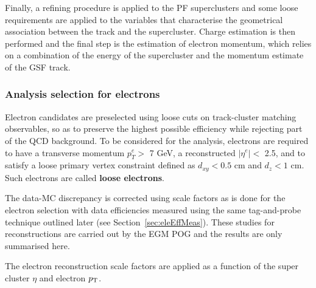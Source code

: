 Finally, a refining procedure is applied to the PF superclusters
and some loose requirements are applied to the variables that characterise the geometrical association between the track and the supercluster.
Charge estimation is then performed and the final step is the estimation of electron momentum,
which relies on a combination of the energy of the supercluster and the momentum estimate of the GSF track.

\subsubsection{Analysis selection for electrons}
\label{sec:ele_selection}
Electron candidates are preselected using loose cuts on track-cluster matching observables, so as to preserve the highest possible efficiency while rejecting part of the QCD background. To be considered for the analysis, electrons are required to have a
transverse momentum $p^e_T >$ 7 GeV, a reconstructed $|\eta^e| <$ 2.5, and to satisfy a loose primary vertex 
constraint defined as $d_{xy} < 0.5$ cm and $d_z < 1$ cm.
Such electrons are called {\bf loose electrons}.

The data-MC discrepancy is corrected using scale factors as is done for the electron selection with data efficiencies measured using the same tag-and-probe technique outlined later (see Section~\ref{sec:eleEffMeas}). 
These studies for reconstructions are carried out by the EGM POG and the results are only summarised here.

The electron reconstruction scale factors 
are applied as a function of the super cluster $\eta$ and electron $p_{\mathrm{T}}$.


